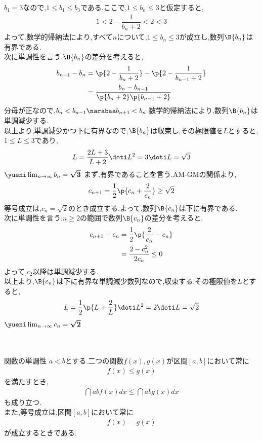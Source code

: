 \documentclass[dvipdfmx,10pt,fleqn,a4paper,twocolumn]{jsarticle}
\newcommand{\ans}[1]{\mbox{\boldmath{$#1$}}}
\begin{document}
$b_1=3$なので,$1\leq b_1\leq b_3$である.ここで,$1\leq b_n\leq3$と仮定すると,
\begin{align*}
  1<2-\dfrac{1}{b_n+2}<2<3
\end{align*}
よって,数学的帰納法により,すべて$n$について,$1\leq b_n\leq3$が成立し,数列$\B{b_n}$は有界である.\\
次に単調性を言う.$\B{b_n}$の差分を考えると,
\begin{align*}
  b_{n+1}-b_n&=\p{2-\dfrac{1}{b_n+2}}-\p{2-\dfrac{1}{b_{n-1}+2}}\\
  &=\dfrac{b_n-b_{n-1}}{\p{b_n+2}\p{b_{n-1}+2}}
\end{align*}
分母が正なので,$b_n<b_{n-1}\narabaa b_{n+1}<b_n$.数学的帰納法により,数列$\B{b_n}$は単調減少する.\\
以上より,単調減少かつ下に有界なので,$\B{b_n}$は収束し,その極限値を$L$とすると,$1\leq L\leq3$であり,
\begin{align*}
  L=\dfrac{2L+3}{L+2}\doti L^2=3\doti L=\sqrt{3}
\end{align*}
$\yueni\lim_{n\to\infty}b_n=\ans{\sqrt{3}}$
\newpage
\kakkosanb まず,有界であることを言う.AM-GMの関係より,
\begin{align*}
  c_{n+1}=\dfrac12\p{c_n+\dfrac{2}{c_n}}\geq\sqrt{2}
\end{align*}
等号成立は,$c_n=\sqrt{2}$のとき成立する.よって,数列$\B{c_n}$は下に有界である.\\
次に単調性を言う.$n\geq2$の範囲で数列$\B{c_n}$の差分を考えると,
\begin{align*}
  c_{n+1}-c_n&=\dfrac12\p{\dfrac{2}{c_n}-c_n}\\
  &=\dfrac{2-c_n^2}{2c_n}\leq0
\end{align*}
よって,$c_2$以降は単調減少する.\\
以上より,$\B{c_n}$は下に有界な単調減少数列なので,収束する.その極限値を$L$とすると,
\begin{align*}
  L=\dfrac{1}{2}\p{L+\dfrac{2}{L}}\doti L^2=2\doti L=\sqrt{2}
\end{align*}
$\yueni\lim_{n\to\infty}c_n=\ans{\sqrt{2}}$\\\\
{\Large\ans{4章\quad 求積I（数式を中心に）}}\\
\begin{itembox}
  [l]{\enpitu 関数の単調性}
  $a<b$とする.二つの関数$f(x),g(x)$が区間$[a,b]$において常に
  \begin{align*}
    f(x)\leq g(x)
  \end{align*}
  を満たすとき,
  \begin{align*}
    \dint{a}{b}f(x)dx\leq\dint{a}{b}g(x)dx
  \end{align*}
  も成り立つ.\\
  また,等号成立は,区間$[a,b]$において常に
  \begin{align*}
    f(x)=g(x)
  \end{align*}
  が成立するときである.
\end{itembox}\\\\
\end{document}
